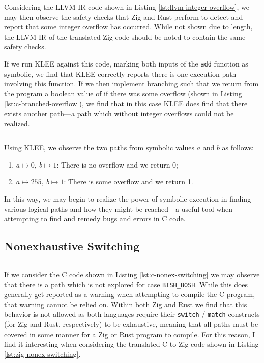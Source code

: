 \documentclass[conference]{IEEEtran}
\newenvironment{code}{\captionsetup{type=listing}}{}
\begin{document}
Considering the LLVM IR code shown in Listing \ref{lst:llvm-integer-overflow}, we may
then observe the safety checks that Zig and Rust perform to detect and report that some
integer overflow has occurred. While not shown due to length, the LLVM IR of the translated
Zig code should be noted to contain the same safety checks.

If we run KLEE against this code, marking both inputs of the \texttt{add} function as symbolic,
we find that KLEE correctly reports there is one execution path involving this function. If we
then implement branching such that we return from the program a boolean value of if there was
some overflow (shown in Listing \ref{lst:c-branched-overflow}), we find that in this case KLEE
does find that there exists another path---a path which without integer overflows could not be
realized.

\begin{code}
    \medskip
    \inputminted{c}{../code-examples/c-klee/advanced_integer_overflow.c}
    \label{lst:c-branched-overflow}
    \medskip
\end{code}

Using KLEE, we observe the two paths from symbolic values $a$ and $b$ as follows:
\begin{enumerate}
    \item $a\mapsto0,\ b\mapsto1$: There is no overflow and we return 0;
    \item $a\mapsto255,\ b\mapsto1$: There is some overflow and we return 1.
\end{enumerate}
In this way, we may begin to realize the power of symbolic execution in finding various
logical paths and how they might be reached---a useful tool when attempting to find and
remedy bugs and errors in C code.


\subsection{Nonexhaustive Switching}
\begin{code}
    \medskip
    \inputminted{c}{../code-examples/c/nonexhaustive-switching.c}
    \label{lst:c-nonex-switching}
    \medskip
\end{code}

If we consider the C code shown in Listing \ref{lst:c-nonex-switching} we may observe that there
is a path which is not explored for case \texttt{BISH\_BOSH}. While this does generally get
reported as a warning when attempting to compile the C program, that warning cannot be relied on.
Within both Zig and Rust we find that this behavior is not allowed as both languages require
their \texttt{switch} / \texttt{match} constructs (for Zig and Rust, respectively) to be
exhaustive, meaning that all paths must be covered in some manner for a Zig or Rust program to
compile. For this reason, I find it interesting when considering the translated C to Zig code
shown in Listing \ref{lst:zig-nonex-switching}.
\end{document}
